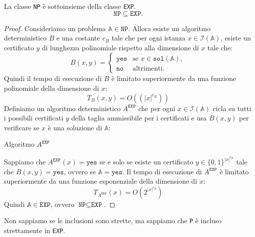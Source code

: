 \begin{theorem}
    La classe \texttt{NP} è sottoinsieme della classe \texttt{EXP}.
    \[
        \texttt{NP} \subseteq \texttt{EXP}.
    \]
\end{theorem}
\begin{proof}
    Consideriamo un problema $\mathbb{A} \in \texttt{NP}$. Allora esiste un algoritmo
    deterministico $B$ e una costante $c_B$ tale che per ogni istanza $x \in
    \mathscr{I}(\mathbb{A})$, esiste un certificato $y$ di lunghezza polinomiale rispetto
    alla dimensione di $x$ tale che:
    \[
        B(x, y) = \begin{cases}
            \texttt{yes} & \text{se } x \in \texttt{sol}(\mathbb{A}), \\
            \texttt{no} & \text{altrimenti}.
        \end{cases}
    \]
    Quindi il tempo di esecuzione di $B$ è limitato superiormente da una funzione polinomiale
    della dimensione di $x$:
    \[
        T_B(x, y) = O((|x|^{c_B}))
    \]
    Definiamo un algoritmo deterministico $A^{\texttt{EXP}}$ che per ogni 
    $x \in \mathscr{I}(\mathbb{A})$ cicla su tutti i possibili certificati $y$ della 
    taglia ammissibile per i certificati e usa $B(x, y)$ per verificare se $x$ è 
    una soluzione di $\mathbb{A}$:

    \begin{algorithm}[H]
        \DontPrintSemicolon
        \caption{Algoritmo $A^{\texttt{EXP}}$}
    \end{algorithm}
    Sappiamo che $A^{\texttt{EXP}}(x) = \texttt{yes}$ se e solo se esiste un certificato
    $y \in \{0,1\}^{|x|^{c_B}}$ tale che $B(x, y) = \texttt{yes}$, ovvero se 
    $\mathbb{A} = \texttt{yes}$. Il tempo di esecuzione di $A^{\texttt{EXP}}$ è limitato
    superiormente da una funzione esponenziale della dimensione di $x$:
    \[
        T_{A^{\texttt{EXP}}}(x) = O(2^{|x|^{c_B}})
    \]
    Quindi $\mathbb{A} \in \texttt{EXP}$, ovvero $\texttt{NP} \subseteq \texttt{EXP}$.
\end{proof}

\begin{figure}[H]
    \centering
\end{figure}
Non sappiamo se le inclusioni sono strette, ma sappiamo che \texttt{P} è incluso
strettamente in \texttt{EXP}.

